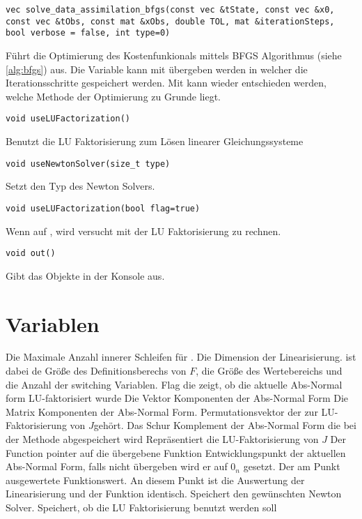 \begin{lstlisting}[numbers=none]
vec solve_data_assimilation_bfgs(const vec &tState, const vec &x0, const vec &tObs, const mat &xObs, double TOL, mat &iterationSteps, bool verbose = false, int type=0)
\end{lstlisting}
Führt die Optimierung des Kostenfunkionals mittels BFGS Algorithmus (siehe \ref{alg:bfgs}) aus. Die Variable  kann mit übergeben werden in welcher die Iterationsschritte gespeichert werden. Mit  kann wieder entschieden werden, welche Methode der Optimierung zu Grunde liegt.
\begin{lstlisting}[numbers=none]
void useLUFactorization()
\end{lstlisting}
Benutzt die LU Faktorisierung zum Lösen linearer Gleichungssysteme
\begin{lstlisting}[numbers=none]
void useNewtonSolver(size_t type)
\end{lstlisting}
Setzt den Typ des Newton Solvers.
\begin{lstlisting}[numbers=none]
void useLUFactorization(bool flag=true)
\end{lstlisting}
Wenn auf , wird versucht mit der LU Faktorisierung zu rechnen. 
\begin{lstlisting}[numbers=none]
void out()
\end{lstlisting}
Gibt das  Objekte in der Konsole aus.
\section[Private Variablen]{\texorpdfstring{}{Private} Variablen}
\begin{description}
 Die Maximale Anzahl innerer Schleifen für .
 Die Dimension der Linearisierung.  ist dabei de Größe des Definitionsberechs von $F$,  die Größe des Wertebereichs und  die Anzahl der switching Variablen.
 Flag die zeigt, ob die aktuelle Abs-Normal form LU-faktorisiert wurde
 Die Vektor Komponenten der Abs-Normal Form
 Die Matrix Komponenten der Abs-Normal Form. 
 Permutationsvektor der zur LU-Faktorisierung von $J$gehört.
 Das Schur Komplement der Abs-Normal Form die bei der Methode  abgespeichert wird
 Repräsentiert die LU-Faktorisierung von $J$
 Der Function pointer auf die übergebene Funktion
 Entwicklungspunkt der aktuellen Abs-Normal Form, falls nicht übergeben wird er auf $0_n$ gesetzt.
 Der am Punkt  ausgewertete Funktionswert. An diesem Punkt ist die Auswertung der Linearisierung und der Funktion identisch.
 Speichert den gewünschten Newton Solver.
 Speichert, ob die LU Faktorisierung benutzt werden soll

\end{description}
